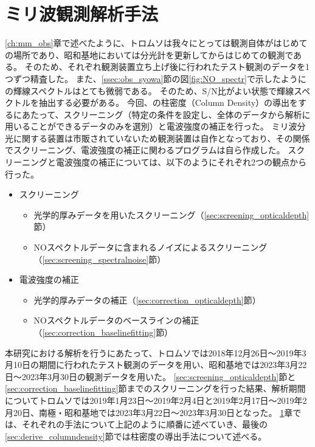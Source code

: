 \chapter{ミリ波観測解析手法}
\label{ch:mm_analysis}
\ref{ch:mm_obs}章で述べたように、トロムソは我々にとっては観測自体がはじめての場所であり、昭和基地においては分光計を更新してからはじめての観測である。
そのため、それぞれ観測装置立ち上げ後に行われたテスト観測のデータを1つずつ精査した。
また、\ref{ssec:obs_syowa}節の図\ref{fig:NO_spectr}で示したようにの輝線スペクトルはとても微弱である。
そのため、S/N比がよい状態で輝線スペクトルを抽出する必要がある。
今回、の柱密度（Column Density）の導出をするにあたって、スクリーニング（特定の条件を設定し、全体のデータから解析に用いることができるデータのみを選別）と電波強度の補正を行った。
ミリ波分光に関する装置は市販されていないため観測装置は自作となっており、その関係でスクリーニング、電波強度の補正に関わるプログラムは自ら作成した。
スクリーニングと電波強度の補正については、以下のようにそれぞれ2つの観点から行った。
\begin{itemize}
    \item スクリーニング
    \begin{itemize}
        \item 光学的厚みデータを用いたスクリーニング（\ref{sec:screening_opticaldepth}節）
        \item NOスペクトルデータに含まれるノイズによるスクリーニング（\ref{sec:screening_spectralnoise}節）
    \end{itemize}
    \item 電波強度の補正
    \begin{itemize}
        \item 光学的厚みデータの補正（\ref{sec:correction_opticaldepth}節）
        \item NOスペクトルデータのベースラインの補正（\ref{sec:correction_baselinefitting}節）
    \end{itemize}
\end{itemize} \par
本研究における解析を行うにあたって、トロムソでは2018年12月26日〜2019年3月10日の期間に行われたテスト観測のデータを用い、昭和基地では2023年3月22日〜2023年3月30日の観測データを用いた。
\ref{sec:screening_opticaldepth}節と\ref{sec:correction_baselinefitting}節までのスクリーニングを行った結果、解析期間についてトロムソでは2019年1月23日〜2019年2月4日と2019年2月17日〜2019年2月20日、南極・昭和基地では2023年3月22日〜2023年3月30日となった。
\ref{ch:mm_analysis}章では、それぞれの手法について上記のように順番に述べていき、最後の\ref{sec:derive_columndensity}節では柱密度の導出手法について述べる。


